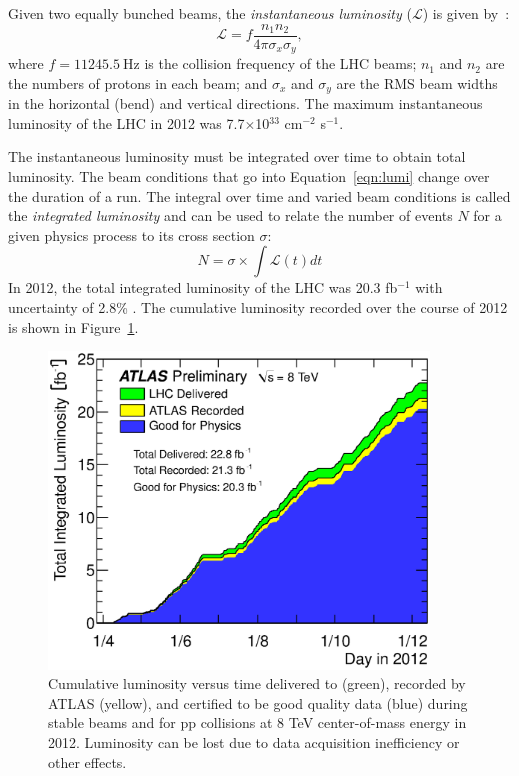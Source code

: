 Given two equally bunched beams, the \emph{instantaneous luminosity} ($\mathcal{L}$) is given by~\cite{PDG}:
\begin{equation}\label{eqn:lumi}
  \mathcal{L} = f \frac{n_1 n_2}{4\pi \sigma_x\sigma_y},
\end{equation}
where $f=\SI{11245.5}{\hertz}$ is the collision frequency of the LHC beams; $n_{1}$ and $n_{2}$ are the numbers of protons in each beam; and $\sigma_{x}$ and $\sigma_{y}$ are the RMS beam widths in the horizontal (bend) and vertical directions. The maximum instantaneous luminosity of the LHC in 2012 was 7.7$\times$10$^{33}$ cm$^{-2}$ s$^{-1}$.

The instantaneous luminosity must be integrated over time to obtain total luminosity. The beam conditions that go into Equation~\ref{eqn:lumi} change over the duration of a run. The integral over time and varied beam conditions is called the \emph{integrated luminosity} and can be used to relate the number of events $N$ for a given physics process to its cross section $\sigma$:
\begin{equation}\label{eqn:nevt}
  N = \sigma \times \int{\mathcal{L}(t) dt}
\end{equation}
In 2012, the total integrated luminosity of the LHC was 20.3 fb$^{-1}$ with uncertainty of 2.8\% \cite{Lumi}. The cumulative luminosity recorded over the course of 2012 is shown in Figure~\ref{fig:2012lumi}.
\begin{figure}[tp]
  \centering
  \includegraphics[width=0.90\textwidth]{fig/atlas/intlumivstime2012DQ.eps}
  \caption{Cumulative luminosity versus time delivered to (green), recorded by ATLAS (yellow), and certified to be good quality data (blue) during stable beams and for pp collisions at 8 TeV center-of-mass energy in 2012. Luminosity can be lost due to data acquisition inefficiency or other effects.}
  \label{fig:2012lumi}
\end{figure}

